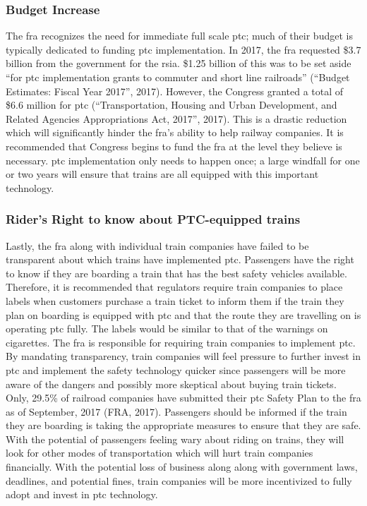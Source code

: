 \documentclass[11pt, titlepage]{article}
\begin{document}
\subsubsection{Budget Increase}

The \gls{fra} recognizes the need for immediate full scale \gls{ptc}; much of their
budget is typically dedicated to funding \gls{ptc} implementation. In 2017, the
\gls{fra} requested \$3.7 billion from the government for the \gls{rsia}.
\$1.25 billion of this was to be set aside ``for \gls{ptc} implementation grants to
commuter and short line railroads'' (``Budget Estimates: Fiscal Year 2017'', 2017).
However, the Congress granted a total of \$6.6 million for \gls{ptc}
(``Transportation, Housing and Urban Development, and Related Agencies
Appropriations Act, 2017'', 2017). This is a drastic reduction which will
significantly hinder the \gls{fra}’s ability to help railway companies. It is
recommended that Congress begins to fund the \gls{fra} at the level they believe is
necessary. \gls{ptc} implementation only needs to happen once; a large windfall for
one or two years will ensure that trains are all equipped with this important
technology.

\subsubsection{Rider’s Right to know about PTC-equipped trains}

Lastly, the \gls{fra} along with individual train companies have failed to be
transparent about which trains have implemented \gls{ptc}. Passengers have the right
to know if they are boarding a train that has the best safety vehicles available.
Therefore, it is recommended that regulators require train companies to place
labels when customers purchase a train ticket to inform them if the train they plan
on boarding is equipped with \gls{ptc} and that the route they are travelling on is
operating \gls{ptc} fully. The labels would be similar to that of the warnings on
cigarettes. The \gls{fra} is responsible for requiring train companies to implement
\gls{ptc}. By mandating transparency, train companies will feel pressure to further
invest in \gls{ptc} and implement the safety technology quicker since passengers
will be more aware of the dangers and possibly more skeptical about buying train
tickets. Only, 29.5\% of railroad companies have submitted their \gls{ptc} Safety
Plan to the \gls{fra} as of September, 2017 (FRA, 2017). Passengers should be
informed if the train they are boarding is taking the appropriate measures to ensure
that they are safe. With the potential of passengers feeling wary about riding on
trains, they will look for other modes of transportation which will hurt train
companies financially. With the potential loss of business along along with
government laws, deadlines, and potential fines, train companies will be more
incentivized to fully adopt and invest in \gls{ptc} technology.
\end{document}
